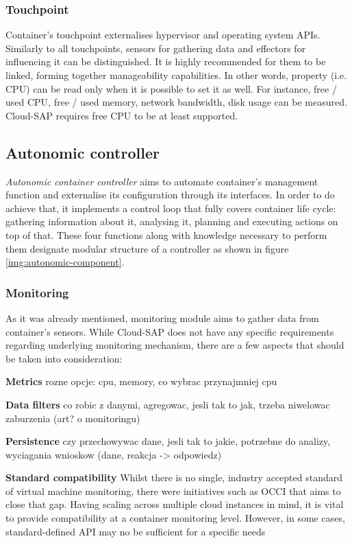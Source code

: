 \subsubsection{Touchpoint}
Container's touchpoint externalises hypervisor and operating system APIs. Similarly to all touchpoints, sensors for gathering data and effectors for influencing it can be distinguished. It is highly recommended for them to be linked, forming together manageability capabilities. In other words, property (i.e. CPU) can be read only when it is possible to set it as well. For instance, free / used CPU, free / used memory, network bandwidth, disk usage can be measured. Cloud-SAP requires free CPU to be at least supported.

\subsection{Autonomic controller}
\emph{Autonomic container controller} aims to automate container's management function and externalise its configuration through its interfaces. In order to do achieve that, it implements a control loop that fully covers container life cycle: gathering information about it, analysing it, planning and executing actions on top of that. These four functions along with knowledge necessary to perform them designate modular structure of a controller as shown in figure \ref{img:autonomic-component}.

\subsubsection{Monitoring}
As it was already mentioned, monitoring module aims to gather data from container's sensors. While Cloud-SAP does not have any specific requirements regarding underlying monitoring mechanism, there are a few aspects that should be taken into consideration:
\begin{asparaenum}
  \item[\textbf{Metrics}] rozne opcje: cpu, memory, co wybrac przynajmniej cpu

  \item[\textbf{Data filters}] co robic z danymi, agregowac, jesli tak to jak, trzeba niwelowac zaburzenia (art? o monitoringu)

  \item[\textbf{Persistence}] czy przechowywac dane, jesli tak to jakie, potrzebne do analizy, wyciagania wnioskow (dane, reakcja -> odpowiedz)

  \item[\textbf{Standard compatibility}] Whilst there is no single, industry accepted standard of virtual machine monitoring, there were initiatives such as OCCI \cite{OCCI} that aims to close that gap. Having scaling across multiple cloud instances in mind, it is vital to provide compatibility at a container monitoring level. However, in some cases, standard-defined API may no be sufficient for a specific needs  
\end{asparaenum}


